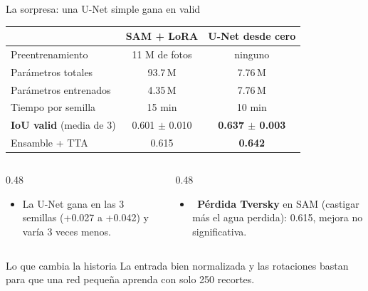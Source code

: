 \documentclass[10pt,aspectratio=1610]{beamer}
\newcommand{\no}{{\color{red!70!black}\ding{55}}}
\begin{document}
\begin{frame}{La sorpresa: una U-Net simple gana en valid}
  \centering\small
  \begin{tabular}{@{}lcc@{}}
    \toprule
    & SAM + LoRA & U-Net desde cero \\ \midrule
    Preentrenamiento & 11 M de fotos & ninguno \\
    Parámetros totales & 93.7\,M & 7.76\,M \\
    Parámetros entrenados & 4.35\,M & 7.76\,M \\
    Tiempo por semilla & 15 min & 10 min \\
    \textbf{IoU valid} (media de 3) & 0.601 $\pm$ 0.010 & \textbf{0.637 $\pm$ 0.003} \\
    Ensamble + TTA & 0.615 & \textbf{0.642} \\
    \bottomrule
  \end{tabular}

  \vspace{3mm}
  \begin{columns}[T]
    \begin{column}{0.48\textwidth}
      \small
      \begin{itemize}
        \item La U-Net gana en las 3 semillas (+0.027 a +0.042) y varía 3 veces menos.
      \end{itemize}
    \end{column}
    \begin{column}{0.48\textwidth}
      \small
      \begin{itemize}
        \item \no\ \textbf{Pérdida Tversky} en SAM (castigar más el agua perdida): 0.615, mejora no significativa.
      \end{itemize}
    \end{column}
  \end{columns}
  \begin{alertblock}{Lo que cambia la historia}
    La entrada bien normalizada y las rotaciones bastan para que una red pequeña aprenda con solo 250 recortes.
  \end{alertblock}
\end{frame}
\end{document}
